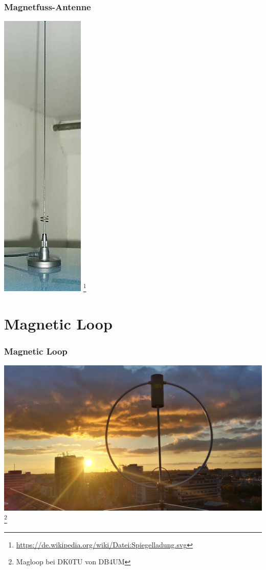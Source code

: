 \begin{frame}
    \frametitle{Magnetfuss-Antenne}
    \begin{center}
        \includegraphics[height=0.99\textheight]{e11/magnetfuss.jpg}
                \footnote{\tiny \url{https://de.wikipedia.org/wiki/Datei:Spiegelladung.svg}}
	\end{center}
\end{frame}

\section*{Magnetic Loop}

\begin{frame}
    \frametitle{Magnetic Loop}
    \begin{center}
        \includegraphics[width=1\textwidth]{e11/Magloop.jpg}
        \footnote{\tiny Magloop bei DK0TU von DB4UM}
	\end{center}
\end{frame}

